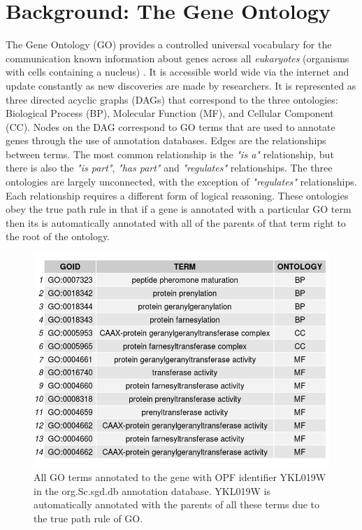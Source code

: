 \documentclass{report}
\begin{document}
	\section{Background: The Gene Ontology}
	
	The Gene Ontology (GO) provides a controlled universal vocabulary for the communication known information about genes across all \textit{eukaryotes} (organisms with cells containing a nucleus) \cite{ashburner2000gene}. It is accessible world wide via the internet and update constantly as new discoveries are made by researchers. It is represented as three directed acyclic graphs (DAGs) that correspond to the three ontologies: Biological Process (BP), Molecular Function (MF), and Cellular Component (CC). Nodes on the DAG correspond to GO terms that are used to annotate genes through the use of annotation databases. Edges are the relationships between terms. The most common relationship is the \textit{"is a"} relationship, but there is also the \textit{"is part"}, \textit{"has part"} and \textit{"regulates"} relationships. The three ontologies are largely unconnected, with the exception of \textit{"regulates"} relationships. Each relationship requires a different form of logical reasoning. These ontologies obey the true path rule in that if a gene is annotated with a particular GO term then its is automatically annotated with all of the parents of that term right to the root of the ontology.
	
	\begin{figure}
		\centering
		\includegraphics[width=\textwidth]{../go_terms_YKL019W.png}
		\caption{All GO terms annotated to the gene with OPF identifier YKL019W in the org.Sc.sgd.db annotation database. YKL019W is automatically annotated with the parents of all these terms due to the true path rule of GO.}
		\label{all_go_YKL019W}
	\end{figure}
	
\end{document}
